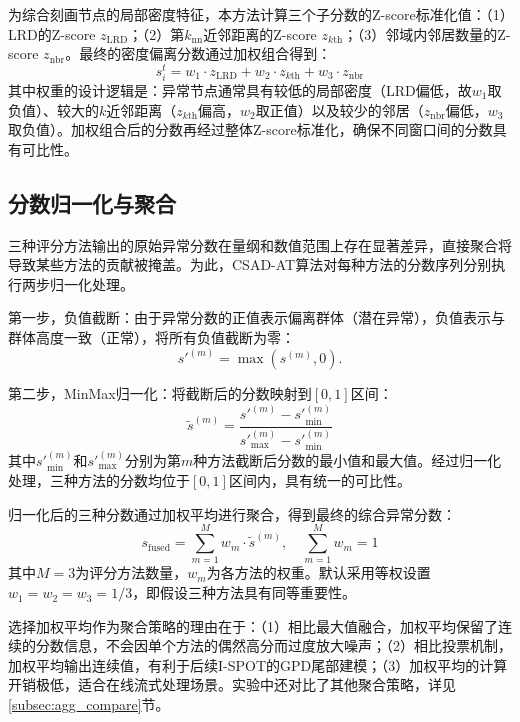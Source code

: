 为综合刻画节点的局部密度特征，本方法计算三个子分数的Z-score标准化值：（1）LRD的Z-score $z_{\text{LRD}}$；（2）第$k_{\text{nn}}$近邻距离的Z-score $z_{k\text{th}}$；（3）邻域内邻居数量的Z-score $z_{\text{nbr}}$。最终的密度偏离分数通过加权组合得到：
\begin{equation}\label{eq:density_score}
    s_i^t = w_1 \cdot z_{\text{LRD}} + w_2 \cdot z_{k\text{th}} + w_3 \cdot z_{\text{nbr}}
\end{equation}
其中权重的设计逻辑是：异常节点通常具有较低的局部密度（LRD偏低，故$w_1$取负值）、较大的$k$近邻距离（$z_{k\text{th}}$偏高，$w_2$取正值）以及较少的邻居（$z_{\text{nbr}}$偏低，$w_3$取负值）。加权组合后的分数再经过整体Z-score标准化，确保不同窗口间的分数具有可比性。

\subsection{分数归一化与聚合}

三种评分方法输出的原始异常分数在量纲和数值范围上存在显著差异，直接聚合将导致某些方法的贡献被掩盖。为此，CSAD-AT算法对每种方法的分数序列分别执行两步归一化处理。

第一步，负值截断：由于异常分数的正值表示偏离群体（潜在异常），负值表示与群体高度一致（正常），将所有负值截断为零：
\begin{equation}
    s'^{(m)} = \max(s^{(m)}, 0).
\end{equation}

第二步，MinMax归一化：将截断后的分数映射到$[0, 1]$区间：
\begin{equation}
    \tilde{s}^{(m)} = \frac{s'^{(m)} - s'^{(m)}_{\min}}{s'^{(m)}_{\max} - s'^{(m)}_{\min}}
\end{equation}
其中$s'^{(m)}_{\min}$和$s'^{(m)}_{\max}$分别为第$m$种方法截断后分数的最小值和最大值。经过归一化处理，三种方法的分数均位于$[0, 1]$区间内，具有统一的可比性。

归一化后的三种分数通过加权平均进行聚合，得到最终的综合异常分数：
\begin{equation}
    s_{\text{fused}} = \sum_{m=1}^{M} w_m \cdot \tilde{s}^{(m)}, \quad \sum_{m=1}^{M} w_m = 1
\end{equation}
其中$M=3$为评分方法数量，$w_m$为各方法的权重。默认采用等权设置$w_1 = w_2 = w_3 = 1/3$，即假设三种方法具有同等重要性。

选择加权平均作为聚合策略的理由在于：（1）相比最大值融合，加权平均保留了连续的分数信息，不会因单个方法的偶然高分而过度放大噪声；（2）相比投票机制，加权平均输出连续值，有利于后续I-SPOT的GPD尾部建模；（3）加权平均的计算开销极低，适合在线流式处理场景。实验中还对比了其他聚合策略，详见\ref{subsec:agg_compare}节。

